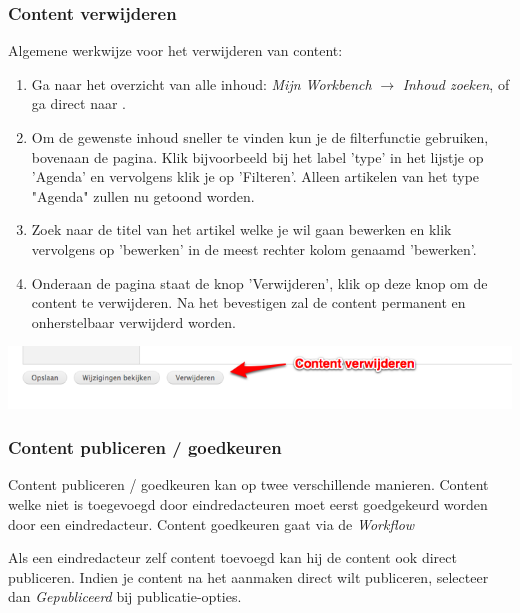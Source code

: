 \subsubsection{Content verwijderen}\label{contentverwijderen}
Algemene werkwijze voor het verwijderen van content:
\begin{enumerate}
\item Ga naar het overzicht van alle inhoud: \emph{Mijn Workbench} $\rightarrow$ \emph{Inhoud zoeken}, of ga direct naar .
\item Om de gewenste inhoud sneller te vinden kun je de filterfunctie gebruiken, bovenaan de pagina. Klik bijvoorbeeld bij het label 'type' in het lijstje op 'Agenda' en vervolgens klik je op 'Filteren'. Alleen artikelen van het type "Agenda" zullen nu getoond worden.
\item Zoek naar de titel van het artikel welke je wil gaan bewerken en klik vervolgens op 'bewerken' in de meest rechter kolom genaamd 'bewerken'.
\item Onderaan de pagina staat de knop 'Verwijderen', klik op deze knop om de content te verwijderen. Na het bevestigen zal de content permanent en onherstelbaar verwijderd worden.
\end{enumerate}

\bigskip

\begin{center}
	\includegraphics[width=\textwidth]{img/content3.png}
\end{center}

\subsubsection{Content publiceren / goedkeuren}\label{contentpubliceren}
Content publiceren / goedkeuren kan op twee verschillende manieren. Content welke niet is toegevoegd door eindredacteuren moet eerst goedgekeurd worden door een eindredacteur. Content goedkeuren gaat via de \emph{Workflow}

Als een eindredacteur zelf content toevoegd kan hij de content ook direct publiceren. Indien je content na het aanmaken direct wilt publiceren, selecteer dan \emph{Gepubliceerd} bij publicatie-opties. 

